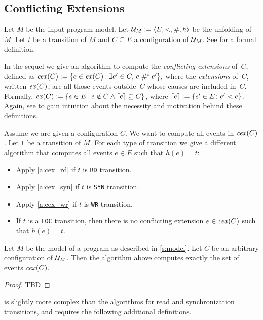 \documentclass{llncs}
\begin{document}
\subsection{Conflicting Extensions}


Let $M$ be the input program model.
Let $\mathcal{U}_{M} \mathrel{:=} \langle E,<,\mathrel{\#},h\rangle$ be the unfolding of $M$.
Let $t$ be a transition of $M$ and $C \subseteq E$ a configuration of $\mathcal{U}_{M}$.
See \cite{RSSK15long} for a formal definition.

In the sequel we give an algorithm to compute the \emph{conflicting extensions}
of~$C$, defined as
$
\mathop{\mathit{cex}} (C) \mathrel{:=}
{\{ e \in \mathop{\mathit{ex}} (C) \colon \exists e' \in C,\, e \mathrel{\#^i_{}}{} e' \mathclose \}},
$
where the \emph{extensions} of~$C$, written $\mathop{\mathit{ex}} (C)$,
are all those events outside~$C$ whose causes are included in~$C$.
Formally,
$
\mathop{\mathit{ex}} (C) \mathrel{:=}
{\{ e \in E \colon e \notin C \land \left \lceil e \right \rceil \subseteq C \mathclose \}}
$, where
$\left \lceil e \right \rceil \mathrel{:=} {\{ e' \in E \colon e' < e \mathclose \}}$.
Again, see \cite{RSSK15long} to gain intuition about the necessity and motivation
behind these definitions.

Assume we are given a configuration $C$.
We want to compute all events in $\mathop{\mathit{cex}} (C)$.
Let \verb!t! be a transition of $M$.
For each type of transition we give a different algorithm that computes all
events $e \in E$ such that $h(e) = t$:
\begin{itemize}
\item Apply \cref{a:cex_rd} if $t$ is \verb!RD! transition.
\item Apply \cref{a:cex_syn} if $t$ is \verb!SYN! transition.
\item Apply \cref{a:cex_wr} if $t$ is \verb!WR! transition.
\item If $t$ is a \verb!LOC! transition, then there is no conflicting extension
$e \in \mathop{\mathit{cex}} (C)$ such that $h(e) = t$.
\end{itemize}

\begin{theorem}
Let $M$ be the model of a program as described in \cref{s:model}.
Let $C$ be an arbitrary configuration of $\mathcal{U}_{M}$.
Then the algorithm above computes exactly the set of events $\mathop{\mathit{cex}} (C)$.
\end{theorem}
\begin{proof}
TBD
\end{proof}

 is slightly more complex than the algorithms for read and
synchronization transitions, and requires the following additional definitions.
\end{document}
